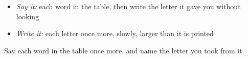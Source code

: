 \begin{itemize}
\raggedright
  \item \emph{Say it:} each word in the table, then write the letter it gave you without looking
  \item \emph{Write it:} each letter once more, slowly, larger than it is printed
\end{itemize}

\begin{tcolorbox}[breakable,colback=teal!4,colframe=teal!35!black,title={Before you move on}]
Say each word in the table once more, and name the letter you took from it.
\end{tcolorbox}
